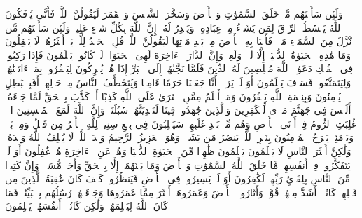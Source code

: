 \startbuffer[\q:29:61]
وَلَئِن سَأَلۡتَهُم مَّنۡ خَلَقَ ٱلسَّمَٰوَٰتِ وَٱلۡأَرۡضَ وَسَخَّرَ ٱلشَّمۡسَ وَٱلۡقَمَرَ لَیَقُولُنَّ ٱللَّهُۖ فَأَنَّىٰ یُؤۡفَكُونَ%
\stopbuffer%
\startbuffer[\q:29:62]
ٱللَّهُ یَبۡسُطُ ٱلرِّزۡقَ لِمَن یَشَاۤءُ مِنۡ عِبَادِهِۦ وَیَقۡدِرُ لَهُۥۤۚ إِنَّ ٱللَّهَ بِكُلِّ شَیۡءٍ عَلِیمࣱ%
\stopbuffer%
\startbuffer[\q:29:63]
وَلَئِن سَأَلۡتَهُم مَّن نَّزَّلَ مِنَ ٱلسَّمَاۤءِ مَاۤءࣰ فَأَحۡیَا بِهِ ٱلۡأَرۡضَ مِنۢ بَعۡدِ مَوۡتِهَا لَیَقُولُنَّ ٱللَّهُۚ قُلِ ٱلۡحَمۡدُ لِلَّهِۚ بَلۡ أَكۡثَرُهُمۡ لَا یَعۡقِلُونَ%
\stopbuffer%
\startbuffer[\q:29:64]
وَمَا هَٰذِهِ ٱلۡحَیَوٰةُ ٱلدُّنۡیَاۤ إِلَّا لَهۡوࣱ وَلَعِبࣱۚ وَإِنَّ ٱلدَّارَ ٱلۡءَاخِرَةَ لَهِیَ ٱلۡحَیَوَانُۚ لَوۡ كَانُوا۟ یَعۡلَمُونَ%
\stopbuffer%
\startbuffer[\q:29:65]
فَإِذَا رَكِبُوا۟ فِی ٱلۡفُلۡكِ دَعَوُا۟ ٱللَّهَ مُخۡلِصِینَ لَهُ ٱلدِّینَ فَلَمَّا نَجَّىٰهُمۡ إِلَى ٱلۡبَرِّ إِذَا هُمۡ یُشۡرِكُونَ%
\stopbuffer%
\startbuffer[\q:29:66]
لِیَكۡفُرُوا۟ بِمَاۤ ءَاتَیۡنَٰهُمۡ وَلِیَتَمَتَّعُوا۟ۚ فَسَوۡفَ یَعۡلَمُونَ%
\stopbuffer%
\startbuffer[\q:29:67]
أَوَ لَمۡ یَرَوۡا۟ أَنَّا جَعَلۡنَا حَرَمًا ءَامِنࣰا وَیُتَخَطَّفُ ٱلنَّاسُ مِنۡ حَوۡلِهِمۡۚ أَفَبِٱلۡبَٰطِلِ یُؤۡمِنُونَ وَبِنِعۡمَةِ ٱللَّهِ یَكۡفُرُونَ%
\stopbuffer%
\startbuffer[\q:29:68]
وَمَنۡ أَظۡلَمُ مِمَّنِ ٱفۡتَرَىٰ عَلَى ٱللَّهِ كَذِبًا أَوۡ كَذَّبَ بِٱلۡحَقِّ لَمَّا جَاۤءَهُۥۤۚ أَلَیۡسَ فِی جَهَنَّمَ مَثۡوࣰى لِّلۡكَٰفِرِینَ%
\stopbuffer%
\startbuffer[\q:29:69]
وَٱلَّذِینَ جَٰهَدُوا۟ فِینَا لَنَهۡدِیَنَّهُمۡ سُبُلَنَاۚ وَإِنَّ ٱللَّهَ لَمَعَ ٱلۡمُحۡسِنِینَ%
\stopbuffer%
\startbuffer[\q:30:1]
الۤمۤ%
\stopbuffer%
\startbuffer[\q:30:2]
غُلِبَتِ ٱلرُّومُ%
\stopbuffer%
\startbuffer[\q:30:3]
فِیۤ أَدۡنَى ٱلۡأَرۡضِ وَهُم مِّنۢ بَعۡدِ غَلَبِهِمۡ سَیَغۡلِبُونَ%
\stopbuffer%
\startbuffer[\q:30:4]
فِی بِضۡعِ سِنِینَۗ لِلَّهِ ٱلۡأَمۡرُ مِن قَبۡلُ وَمِنۢ بَعۡدُۚ وَیَوۡمَئِذࣲ یَفۡرَحُ ٱلۡمُؤۡمِنُونَ%
\stopbuffer%
\startbuffer[\q:30:5]
بِنَصۡرِ ٱللَّهِۚ یَنصُرُ مَن یَشَاۤءُۖ وَهُوَ ٱلۡعَزِیزُ ٱلرَّحِیمُ%
\stopbuffer%
\startbuffer[\q:30:6]
وَعۡدَ ٱللَّهِۖ لَا یُخۡلِفُ ٱللَّهُ وَعۡدَهُۥ وَلَٰكِنَّ أَكۡثَرَ ٱلنَّاسِ لَا یَعۡلَمُونَ%
\stopbuffer%
\startbuffer[\q:30:7]
یَعۡلَمُونَ ظَٰهِرࣰا مِّنَ ٱلۡحَیَوٰةِ ٱلدُّنۡیَا وَهُمۡ عَنِ ٱلۡءَاخِرَةِ هُمۡ غَٰفِلُونَ%
\stopbuffer%
\startbuffer[\q:30:8]
أَوَ لَمۡ یَتَفَكَّرُوا۟ فِیۤ أَنفُسِهِمۗ مَّا خَلَقَ ٱللَّهُ ٱلسَّمَٰوَٰتِ وَٱلۡأَرۡضَ وَمَا بَیۡنَهُمَاۤ إِلَّا بِٱلۡحَقِّ وَأَجَلࣲ مُّسَمࣰّىۗ وَإِنَّ كَثِیرࣰا مِّنَ ٱلنَّاسِ بِلِقَاۤئِ رَبِّهِمۡ لَكَٰفِرُونَ%
\stopbuffer%
\startbuffer[\q:30:9]
أَوَ لَمۡ یَسِیرُوا۟ فِی ٱلۡأَرۡضِ فَیَنظُرُوا۟ كَیۡفَ كَانَ عَٰقِبَةُ ٱلَّذِینَ مِن قَبۡلِهِمۡۚ كَانُوۤا۟ أَشَدَّ مِنۡهُمۡ قُوَّةࣰ وَأَثَارُوا۟ ٱلۡأَرۡضَ وَعَمَرُوهَاۤ أَكۡثَرَ مِمَّا عَمَرُوهَا وَجَاۤءَتۡهُمۡ رُسُلُهُم بِٱلۡبَیِّنَٰتِۖ فَمَا كَانَ ٱللَّهُ لِیَظۡلِمَهُمۡ وَلَٰكِن كَانُوۤا۟ أَنفُسَهُمۡ یَظۡلِمُونَ%
